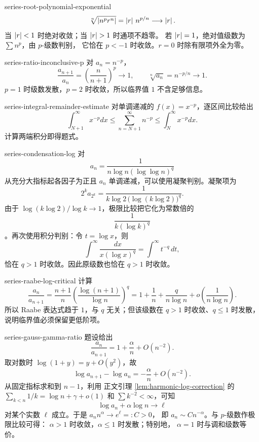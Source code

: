 \begin{solution}{series-root-polynomial-exponential}
\[
 \sqrt[n]{\left|n^pr^n\right|}
 =\left|r\right|\,n^{p/n}\longrightarrow\left|r\right|.
\]
当 \(\left|r\right|<1\) 时绝对收敛；当 \(\abs r>1\) 时通项不趋零。
若 \(\left|r\right|=1\)，绝对值级数为 \(\sum n^p\)，由 \(p\)-级数判别，
它恰在 \(p<-1\) 时收敛。\(r=0\) 时除有限项外全为零。
\end{solution}

\begin{solution}{series-ratio-inconclusive-p}
对 \(a_n=n^{-p}\)，
\[
 \frac{a_{n+1}}{a_n}=\left(\frac n{n+1}\right)^p\to1,
\qquad
 \sqrt[n]{a_n}=n^{-p/n}\to1.
\]
\(p=1\) 时级数发散，\(p=2\) 时收敛，所以临界值 \(1\) 不含足够信息。
\end{solution}

\begin{solution}{series-integral-remainder-estimate}
对单调递减的 \(f(x)=x^{-p}\)，逐区间比较给出
\[
 \int_{N+1}^\infty x^{-p}dx
 \le\sum_{n=N+1}^\infty n^{-p}
 \le\int_N^\infty x^{-p}dx.
\]
计算两端积分即得题式。
\end{solution}

\begin{solution}{series-condensation-log}
对
\[
 a_n=\frac1{n\log n(\log\log n)^q}
\]
从充分大指标起各因子为正且 \(a_n\) 单调递减，可以使用凝聚判别。凝聚项为
\[
 2^k a_{2^k}
 =\frac{1}{k\log2\,\bigl(\log(k\log2)\bigr)^q}.
\]
由于 \(\log(k\log2)/\log k\to1\)，极限比较把它化为常数倍的
\[
 \frac{1}{k(\log k)^q}
\]
。再次使用积分判别：令 \(t=\log x\)，则
\[
 \int^\infty\frac{dx}{x(\log x)^q}
 =\int^\infty t^{-q}\,dt,
\]
恰在 \(q>1\) 时收敛。因此原级数也恰在 \(q>1\) 时收敛。
\end{solution}

\begin{solution}{series-raabe-log-critical}
计算
\[
 \frac{a_n}{a_{n+1}}
 =\frac{n+1}{n}
  \left(\frac{\log(n+1)}{\log n}\right)^q
 =1+\frac1n+\frac{q}{n\log n}
  +o\!\left(\frac1{n\log n}\right).
\]
所以 Raabe 表达式趋于 \(1\)，与 \(q\) 无关；但该级数在
\(q>1\) 时收敛、\(q\le1\) 时发散，说明临界值必须保留更低阶项。
\end{solution}

\begin{solution}{series-gauss-gamma-ratio}
题设给出
\[
 \frac{a_n}{a_{n+1}}=1+\frac{\alpha}{n}+O(n^{-2}).
\]
取对数时 \(\log(1+y)=y+O(y^2)\)，故
\[
 \log a_{n+1}-\log a_n
 =-\frac{\alpha}{n}+O(n^{-2}).
\]
从固定指标求和到 \(n-1\)，利用
正文引理 \ref{lem:harmonic-log-correction} 的
\(\sum_{k<n}1/k=\log n+\gamma+o(1)\) 和
\(\sum k^{-2}<\infty\)，可知
\[
 \log a_n+\alpha\log n\longrightarrow\ell
\]
对某个实数 \(\ell\) 成立。于是 \(a_nn^\alpha\to e^\ell=:C>0\)，
即 \(a_n\sim Cn^{-\alpha}\)。与 \(p\)-级数作极限比较可得：
\(\alpha>1\) 时收敛，\(\alpha\le1\) 时发散；特别地，
\(\alpha=1\) 时与调和级数等价。
\end{solution}

